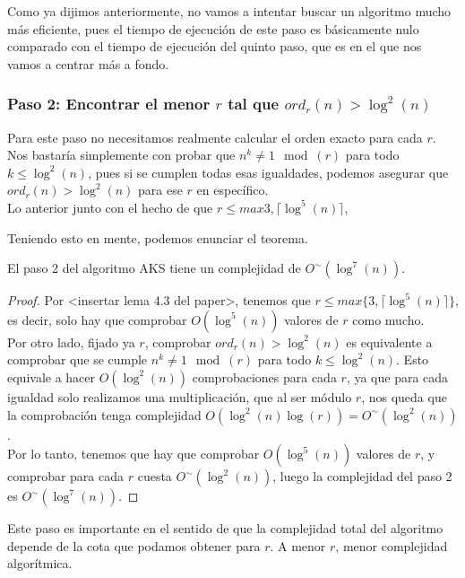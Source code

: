 Como ya dijimos anteriormente, no vamos a intentar buscar un algoritmo mucho más eficiente, pues el tiempo de ejecución de este paso es básicamente nulo comparado con el tiempo de ejecución del quinto paso, que es en el que nos vamos a centrar más a fondo.

\subsubsection{Paso 2: Encontrar el menor $r$ tal que $ord_r(n) > \log^2(n)$}

Para este paso no necesitamos realmente calcular el orden exacto para cada $r$. Nos bastaría simplemente con probar que $n^k \neq 1 \mod(r)$ para todo $k \leq \log^2(n)$, pues si se cumplen todas esas igualdades, podemos asegurar que $ord_r(n) > \log^2(n)$ para ese $r$ en específico.\\

Lo anterior junto con el hecho de que $r \leq max{3, \lceil \log^5(n) \rceil}$,

Teniendo esto en mente, podemos enunciar el teorema.

\begin{teorema}
	El paso 2 del algoritmo AKS tiene un complejidad de $O^\sim(\log^7(n))$.
\end{teorema}

\begin{proof}
	Por <insertar lema 4.3 del paper>, tenemos que $r \leq max\{3, \lceil \log^5(n) \rceil \}$, es decir, solo hay que comprobar $O(\log^5(n))$ valores de $r$ como mucho.\\
	
	Por otro lado, fijado ya $r$, comprobar $ord_r(n) > \log^2(n)$ es equivalente a comprobar que se cumple $n^k \neq 1 \mod(r)$ para todo $k \leq \log^2(n)$. Esto equivale a hacer $O(\log^2(n))$ comprobaciones para cada $r$, ya que para cada igualdad solo realizamos una multiplicación, que al ser módulo $r$, nos queda que la comprobación tenga complejidad $O(\log^2(n)\log(r)) = O^\sim(\log^2(n))$.\\
	
	Por lo tanto, tenemos que hay que comprobar $O(\log^5(n))$ valores de $r$, y comprobar para cada $r$ cuesta $O^\sim(\log^2(n))$, luego la complejidad del paso 2 es $O^\sim(\log^7(n))$.
\end{proof}

Este paso es importante en el sentido de que la complejidad total del algoritmo depende de la cota que podamos obtener para $r$. A menor $r$, menor complejidad algorítmica.

